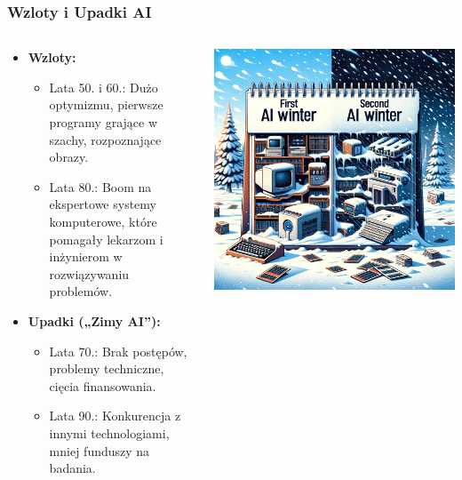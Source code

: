 \documentclass[smaller]{beamer}
\begin{document}

\begin{frame}
\frametitle{Wzloty i Upadki AI}

\begin{columns}
    \begin{column}{0.6\textwidth}
        \begin{itemize}
            \item \textbf{Wzloty:}
            \begin{itemize}
                \item Lata 50. i 60.: Dużo optymizmu, pierwsze programy grające w szachy, rozpoznające obrazy.
                \item Lata 80.: Boom na ekspertowe systemy komputerowe, które pomagały lekarzom i inżynierom w rozwiązywaniu problemów.
            \end{itemize}
            \item \textbf{Upadki („Zimy AI”):}
            \begin{itemize}
                \item Lata 70.: Brak postępów, problemy techniczne, cięcia finansowania.
                \item Lata 90.: Konkurencja z innymi technologiami, mniej funduszy na badania.
            \end{itemize}
        \end{itemize}
    \end{column}

    \begin{column}{0.4\textwidth}
        \includegraphics[width=\textwidth]{../manifest/ai-winter.png}
    \end{column}
\end{columns}
\end{frame}
\end{document}
